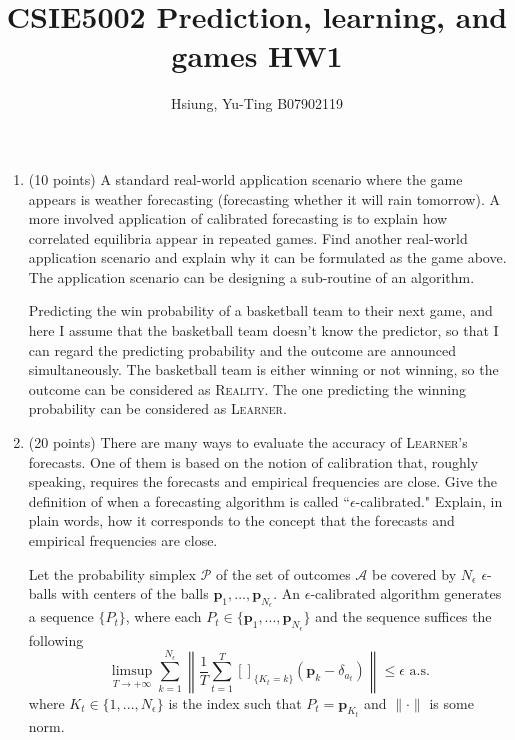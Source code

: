 \documentclass[a4paper, 12pt]{article}
\title{CSIE5002 Prediction, learning, and games HW1}
\author{Hsiung, Yu-Ting B07902119}
\begin{document}
\maketitle

\begin{enumerate}
    \item (10 points) A standard real-world application scenario where the game appears is weather forecasting (forecasting whether it will rain tomorrow). A more involved application of calibrated forecasting is to explain how correlated equilibria appear in repeated games. Find another real-world application scenario and explain why it can be formulated as the game above. The application scenario can be designing a sub-routine of an algorithm.
    \par {\color{blue} Predicting the win probability of a basketball team to their next game, and here I assume that the basketball team doesn't know the predictor, so that I can regard the predicting probability and the outcome are announced simultaneously. The basketball team is either winning or not winning, so the outcome can be considered as \textsc{Reality}. The one predicting the winning probability can be considered as \textsc{Learner}.}

    \item (20 points) There are many ways to evaluate the accuracy of \textsc{Learner}'s forecasts. One of them is based on the notion of calibration that, roughly speaking, requires the forecasts and empirical frequencies are close. Give the definition of when a forecasting algorithm is called ``$\epsilon$-calibrated." Explain, in plain words, how it corresponds to the concept that the forecasts and empirical frequencies are close.
    \par {\color{blue} Let the probability simplex $\mathscr{P}$ of the set of outcomes $\mathscr{A}$ be covered by $N_\epsilon$ $\epsilon$-balls with centers of the balls $\mathbf{p}_1, ..., \mathbf{p}_{N_\epsilon}$. An $\epsilon$-calibrated algorithm generates a sequence $\{P_t\}$, where each $P_t \in \{\mathbf{p}_1, ..., \mathbf{p}_{N_\epsilon}\}$ and the sequence suffices the following
    \[\limsup_{T \to +\infty} \sum_{k=1}^{N_\epsilon} \left\lVert \frac{1}{T} \sum_{t=1}^T []_{\{K_t=k\}}(\mathbf{p}_k - \delta_{a_t})\right\rVert \leq \epsilon \text{ a.s.}\]
    where $K_t \in \{1, ..., N_\epsilon\}$ is the index such that $P_t = \mathbf{p}_{K_t}$ and $\lVert \cdot \rVert$ is some norm.

}
\end{enumerate}
\end{document}
